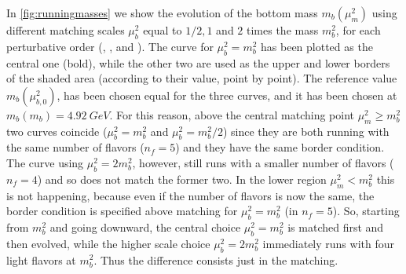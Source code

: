 In \cref{fig:runningmasses} we show the evolution of the \msbar{} bottom mass
$m_b(\mu_m^2)$ using different matching scales $\mu_b^2$ equal to $1/2,1$ and
$2$ times the mass $m_b^2$, for each perturbative order (\lo{}, \nlo{}, and
\nnlo{}).
The curve for $\mu_b^2 = m_b^2$ has been plotted as the central one (bold),
while the other two are used as the upper and lower borders of the shaded area
(according to their value, point by point).
The reference value $m_b(\mu_{b,0}^2)$, has been chosen equal for the
three curves, and it has been chosen at $m_b(m_b) = \SI{4.92}{GeV}$.
For this reason, above the central matching point $\mu_m^2 \ge m_b^2$ two curves coincide
($\mu_b^2 = m_b^2$ and $\mu_b^2 = m_b^2/2$) since they are both
running with the same number of flavors ($n_f=5$) and they have the same
border condition. The curve using $\mu_b^2 = 2m_b^2$, however, still runs with
a smaller number of flavors ($n_f=4$) and so does not match the former two.
In the lower region $\mu_m^2 < m_b^2$ this is not happening, because even
if the number of flavors is now the same,
the border condition is specified above matching for $\mu_b^2 = m_b^2$ (in
$n_f=5$).
So, starting from $m_b^2$ and going downward, the central choice $\mu_b^2 =
m_b^2$ is matched first and then evolved, while the higher scale choice
$\mu_b^2 = 2m_b^2$ immediately runs with four light flavors at $m_b^2$. Thus
the difference consists just in the matching.
